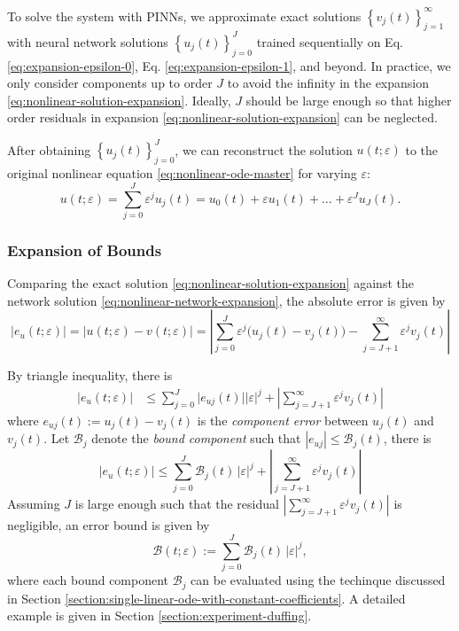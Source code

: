 \documentclass{article}
\newcommand{\Err}{e}
\newcommand{\Bound}{\mathcal{B}}
\begin{document}
    To solve the system with PINNs, we approximate exact solutions $\left\{v_j(t)\right\}_{j=1}^{\infty}$ with neural network solutions $\left\{u_j(t)\right\}_{j=0}^{J}$ trained sequentially on Eq. \ref{eq:expansion-epsilon-0}, Eq. \ref{eq:expansion-epsilon-1}, and beyond. 
    In practice, we only consider components up to order $J$ to avoid the infinity in the expansion \ref{eq:nonlinear-solution-expansion}. 
    Ideally, $J$ should be large enough so that higher order residuals in expansion \ref{eq:nonlinear-solution-expansion} can be neglected.

    After obtaining $\left\{u_j(t)\right\}_{j=0}^{J}$, we can reconstruct the solution $u(t;\varepsilon)$ to the original nonlinear equation \ref{eq:nonlinear-ode-master} for varying $\varepsilon$:
    \begin{equation}\label{eq:nonlinear-network-expansion}
        u(t;\varepsilon) = \sum_{j=0}^{J} \varepsilon^j u_j(t) = u_0(t) + \varepsilon u_1(t) + \dots + \varepsilon^J u_J(t).
    \end{equation}

\subsubsection{Expansion of Bounds}
    Comparing the exact solution \ref{eq:nonlinear-solution-expansion} against the network solution \ref{eq:nonlinear-network-expansion}, the absolute error is given by 
    \begin{equation}
    |\Err_u(t; \varepsilon)| = \Big|u(t; \varepsilon) - v(t; \varepsilon)\Big| = \left|\sum_{j=0}^{J} \varepsilon^{j} \Big(u_j(t) - v_j(t)\Big) - \sum_{j=J+1}^{\infty} \varepsilon^j v_j(t)\right|
    \end{equation}

    By triangle inequality, there is 
    \begin{align}
    \Big|\Err_u(t; \varepsilon)\Big| &\leq \sum_{j=0}^{J} \Big|\Err_{uj}(t)\Big||\varepsilon|^j + \left|\sum_{j=J+1}^{\infty}\varepsilon^j v_j(t)\right|
    \end{align}
    where $\Err_{uj}(t) := u_j(t) - v_j(t)$ is the \textit{component error} between $u_j(t)$ and $v_j(t)$.
    Let $\Bound_{j}$ denote the \textit{bound component} such that $|\Err_{uj}| \leq \Bound_j(t)$, there is 
    \begin{equation}
    \Big|\Err_u(t; \varepsilon)\Big| \leq \sum_{j=0}^{J} \Bound_j(t)\,|\varepsilon|^j + \left|\sum_{j=J+1}^{\infty}\varepsilon^j v_j(t)\right|
    \end{equation}
    Assuming $J$ is large enough such that the residual $\displaystyle \left|\sum_{j=J+1}^{\infty}\varepsilon^j v_j(t)\right|$ is negligible, an error bound is given by
    \begin{equation}
        \Bound(t; \varepsilon) := \sum_{j=0}^{J} \Bound_j(t)\,|\varepsilon|^j,
    \end{equation} 
    where each bound component $\Bound_j$ can be evaluated using the techinque discussed in Section \ref{section:single-linear-ode-with-constant-coefficients}. A detailed example is given in Section \ref{section:experiment-duffing}.
\end{document}
